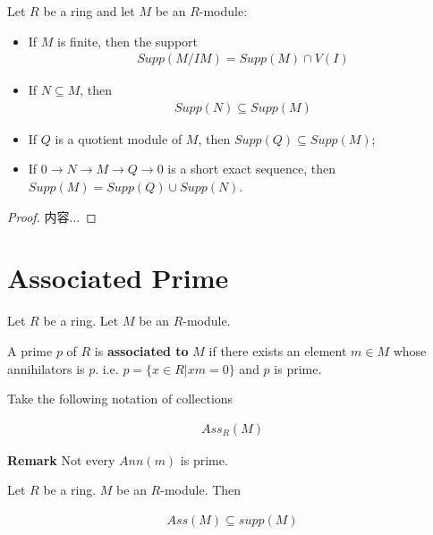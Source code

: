 \documentclass[Total.tex]{subfiles}
\begin{document}
			\begin{lemma}
				Let $R$ be a ring and let $M$ be an $R$-module:
				\begin{itemize}
					\item If $M$ is finite, then the support
					\begin{gather*}
						Supp(M/IM)=Supp(M)\cap V(I)
					\end{gather*}
					\item If $N\subseteq M$, then
					\begin{gather*}
						Supp(N)\subseteq Supp(M)
					\end{gather*}
					\item If $Q$ is a quotient module of $M$, then $Supp(Q)\subseteq Supp(M)$;
					\item If $0\rightarrow N\rightarrow M\rightarrow Q\rightarrow 0$ is a short exact sequence, then $Supp(M)=Supp(Q)\cup Supp(N)$.
				\end{itemize}
			\end{lemma}
			\begin{proof}
				内容...
			\end{proof}
		\section{Associated Prime}
			
			\begin{Def}
				Let $R$ be a ring. Let $M$ be an $R$-module. 
				
				A prime $p$ of $R$ is \textbf{associated to} $M$ if there exists an element $m\in M$ whose annihilators is $p$. i.e. $p=\{x\in R|xm=0\}$ and $p$ is prime. 
				
				Take the following notation of collections 
				
				\begin{gather*}
					Ass_R(M)
				\end{gather*}
			\end{Def}
			
			\textbf{Remark} Not every $Ann(m)$ is prime. 
			
			\begin{example}
				
			\end{example}
			
			\begin{lemma}
				Let $R$ be a ring. $M$ be an $R$-module. Then
				
				\begin{gather*}
					Ass(M)\subseteq supp(M)
				\end{gather*}
			\end{lemma}
			
\end{document}
